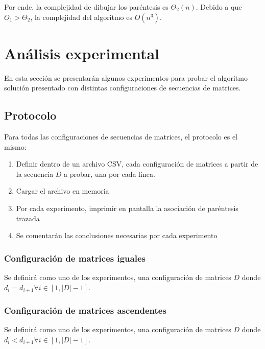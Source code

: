 \documentclass[letter]{article}
\begin{document}
Por ende, la complejidad de dibujar los paréntesis es $\Theta_2(n)$. Debido a que $O_1 > \Theta_2$, la complejidad del algoritmo es $O(n^3)$. \par

\section{Análisis experimental} \label{experimentos}

En esta sección se presentarán algunos experimentos para probar el algoritmo solución presentado con distintas configuraciones de secuencias de matrices. \par

\subsection{Protocolo} \label{experimentos:protocolo}

Para todas las configuraciones de secuencias de matrices, el protocolo es el mismo: \par

\begin{enumerate}
    \item Definir dentro de un archivo CSV, cada configuración de matrices a partir de la secuencia $D$ a probar, una por cada línea.
    \item Cargar el archivo en memoria
    \item Por cada experimento, imprimir en pantalla la asociación de paréntesis trazada
    \item Se comentarán las conclusiones necesarias por cada experimento
\end{enumerate}

\subsubsection{Configuración de matrices iguales}

Se definirá como uno de los experimentos, una configuración de matrices $D$ donde $d_i = d_{i+1} \forall i \in [1, |D| - 1]$.

\subsubsection{Configuración de matrices ascendentes}

Se definirá como uno de los experimentos, una configuración de matrices $D$ donde $d_i < d_{i+1} \forall i \in [1, |D| - 1]$.
\end{document}
